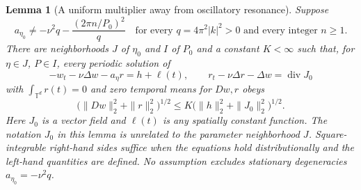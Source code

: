 \documentclass[11pt]{article}
\newtheorem{lemma}[theorem]{Lemma}
\newcommand{\T}{\mathbb T}
\DeclareMathOperator{\diver}{div}
\begin{document}
\begin{lemma}[A uniform multiplier away from oscillatory resonance]
\label{multiplier}
Suppose
\begin{equation}\label{nonresonance}
 a_{\eta_0}\ne-\nu^2q-\frac{(2\pi n/P_0)^2}{q}
 \quad\text{for every }q=4\pi^2|k|^2>0
                    \text{ and every integer }n\geq1.
\end{equation}
There are neighborhoods $J$ of $\eta_0$ and $I$ of $P_0$ and a constant
$K<\infty$ such that, for $\eta\in J$, $P\in I$, every periodic solution
of
\begin{equation}\label{forcedlinear}
 -w_t-\nu\Delta w-a_\eta r=h+\ell(t),\qquad
 r_t-\nu\Delta r-\Delta w=\diver J_0
\end{equation}
with $\int_{\T^d}r(t)=0$ and zero temporal means for $Dw,r$ obeys
\begin{equation}\label{multbound}
 \bigl(\|Dw\|_2^2+\|r\|_2^2\bigr)^{1/2}
 \leq K\bigl(\|h\|_2^2+\|J_0\|_2^2\bigr)^{1/2}.
\end{equation}
Here $J_0$ is a vector field and $\ell(t)$ is any spatially constant
function. The notation $J_0$ in this lemma is unrelated to the parameter
neighborhood $J$. Square-integrable right-hand sides suffice when the
equations hold distributionally and the left-hand quantities are defined.
No assumption excludes stationary degeneracies $a_{\eta_0}=-\nu^2q$.
\end{lemma}
\end{document}
